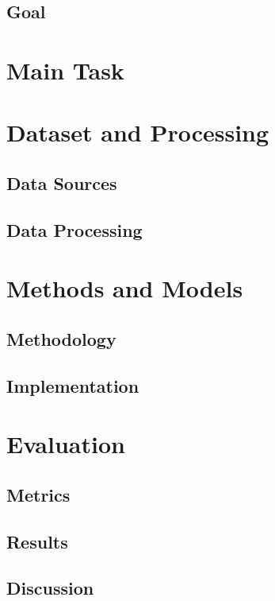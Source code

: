 \documentclass[12pt,a4paper]{article}
\begin{document}
  \subsection{Goal}

  \section{Main Task}

  \section{Dataset and Processing}
  \subsection{Data Sources}

  \subsection{Data Processing}


  \section{Methods and Models}

  \subsection{Methodology}
  \subsection{Implementation}

  \section{Evaluation}
  \subsection{Metrics}

  \subsection{Results}

  \subsection{Discussion}
\end{document}
